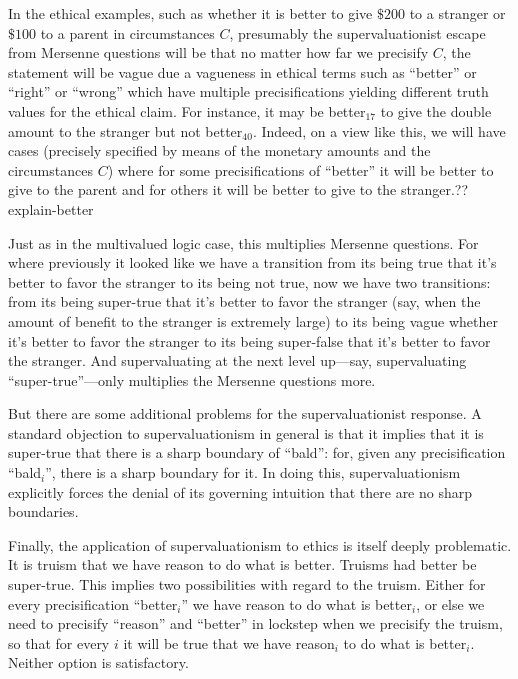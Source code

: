 In the ethical examples, such as whether it is better to give $ \$200$ to a stranger or $ \$100$ to a parent in circumstances $C$, presumably the 
supervaluationist escape from Mersenne questions will be that no matter how far we precisify $C$, the statement will be vague due a vagueness in 
ethical terms such as ``better'' or ``right'' or ``wrong'' which have multiple precisifications yielding different truth values for the ethical
claim. For instance, it may be better$_{17}$ to give the double amount to the stranger but not better$_{40}$. Indeed, on a view like this, we will have cases 
(precisely specified by means of the monetary amounts and the circumstances $C$) where for some precisifications of ``better'' it will be better to 
give to the parent and for others it will be better to give to the stranger.??explain-better  

Just as in the multivalued logic case, this multiplies Mersenne questions. For where previously it looked like we have a transition from its being true that it's better
to favor the stranger to its being not true, now we have two transitions: from its being super-true that it's better to favor the stranger (say, when the amount of
benefit to the stranger is extremely large) to its being vague whether it's better to favor the stranger to its being super-false that it's better to favor the stranger.
And supervaluating at the next level up---say, supervaluating ``super-true''---only multiplies the Mersenne questions more.

But there are some additional problems for the supervaluationist response. A standard objection to supervaluationism in general is that it implies that it is
super-true that there is a sharp boundary of ``bald'': for, given any precisification ``bald$_i$'', there is a sharp boundary for it. In doing this, supervaluationism
explicitly forces the denial of its governing intuition that there are no sharp boundaries. 

Finally, the application of supervaluationism to ethics is itself deeply problematic. It is truism that we have reason to do what is better. Truisms had better be 
super-true. 
This implies two possibilities with regard to the truism.
Either for every precisification ``better$_i$'' we have reason to do what is better$_i$, or else we need to precisify ``reason'' and ``better'' in lockstep
when we precisify the truism, so that for every $i$ it will be true that we have reason$_i$ to do what is better$_i$. Neither option is satisfactory.

